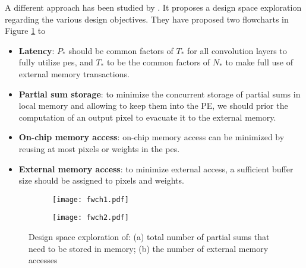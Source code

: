 A different approach has been studied by \cite{ma_optimizing_2018}. It proposes a design space exploration regarding the various design objectives. They have proposed two flowcharts in Figure \ref{fig:flowchart} to
\begin{itemize}
    \item \textbf{Latency}: $P_*$ should be common factors of  $T_*$ for all convolution layers to fully utilize \acrshort{pe}s, and $T_*$ to be the common factors of  $N_*$ to make full use of external memory transactions.
    \item \textbf{Partial sum storage}: to minimize the concurrent storage of partial sums in local memory and allowing to keep them into the PE, we should prior the computation of an output pixel to evacuate it to the external memory.
    \item \textbf{On-chip memory access}: on-chip memory access can be minimized by reusing at most pixels or weights in the \acrshort{pe}s.
    \item \textbf{External memory access}: to minimize external access, a sufficient buffer size should be assigned to pixels and weights.
\end{itemize}
%
\begin{figure}
\centering
    \begin{subfigure}{.45\textwidth}
    \centering
    \texttt{[image: fwch1.pdf]}
    \caption{ }
    \end{subfigure}
    \begin{subfigure}{.45\textwidth}
    \centering
    \texttt{[image: fwch2.pdf]}
    \caption{ }
    \end{subfigure}
    \caption{Design space exploration of: (a) total number of partial sums that need to be stored in memory; (b) the number of external memory accesses \cite{ma_optimizing_2018}}
    \label{fig:flowchart}
\end{figure}
